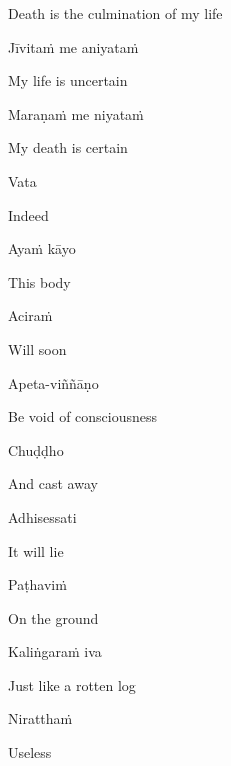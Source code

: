\begin{english}
  Death is the culmination of my life
\end{english}

Jīvitaṁ me aniyataṁ

\begin{english}
  My life is uncertain
\end{english}

Maraṇaṁ me niyataṁ

\begin{english}
  My death is certain
\end{english}


Vata

\begin{english}
  Indeed
\end{english}

Ayaṁ kāyo

\begin{english}
  This body
\end{english}

Aciraṁ

\begin{english}
  Will soon
\end{english}

Apeta-viññāṇo

\begin{english}
  Be void of consciousness
\end{english}

Chuḍḍho

\begin{english}
  And cast away
\end{english}

Adhisessati

\begin{english}
  It will lie
\end{english}

Paṭhaviṁ

\begin{english}
  On the ground
\end{english}

Kaliṅgaraṁ iva

\begin{english}
  Just like a rotten log
\end{english}

Niratthaṁ

\begin{english}
  Useless
\end{english}

